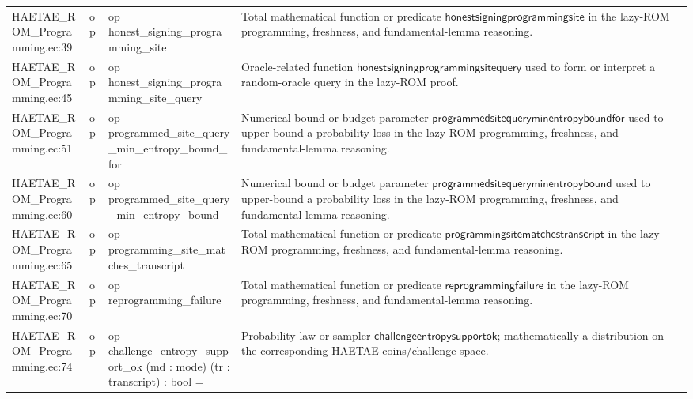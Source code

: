 \documentclass[10pt]{article}
\begin{document}
\begin{longtable}{L{0.11\textwidth}L{0.055\textwidth}L{0.385\textwidth}L{0.41\textwidth}}
HAETAE\_\allowbreak{}ROM\_\allowbreak{}Programming.\allowbreak{}ec:\allowbreak{}39 & op & {\ttfamily\scriptsize op honest\_\allowbreak{}signing\_\allowbreak{}programming\_\allowbreak{}site} & Total mathematical function or predicate $\mathsf{honestsigningprogrammingsite}$ in the lazy-ROM programming, freshness, and fundamental-lemma reasoning. \\
HAETAE\_\allowbreak{}ROM\_\allowbreak{}Programming.\allowbreak{}ec:\allowbreak{}45 & op & {\ttfamily\scriptsize op honest\_\allowbreak{}signing\_\allowbreak{}programming\_\allowbreak{}site\_\allowbreak{}query} & Oracle-related function $\mathsf{honestsigningprogrammingsitequery}$ used to form or interpret a random-oracle query in the lazy-ROM proof. \\
HAETAE\_\allowbreak{}ROM\_\allowbreak{}Programming.\allowbreak{}ec:\allowbreak{}51 & op & {\ttfamily\scriptsize op programmed\_\allowbreak{}site\_\allowbreak{}query\_\allowbreak{}min\_\allowbreak{}entropy\_\allowbreak{}bound\_\allowbreak{}for} & Numerical bound or budget parameter $\mathsf{programmedsitequeryminentropyboundfor}$ used to upper-bound a probability loss in the lazy-ROM programming, freshness, and fundamental-lemma reasoning. \\
HAETAE\_\allowbreak{}ROM\_\allowbreak{}Programming.\allowbreak{}ec:\allowbreak{}60 & op & {\ttfamily\scriptsize op programmed\_\allowbreak{}site\_\allowbreak{}query\_\allowbreak{}min\_\allowbreak{}entropy\_\allowbreak{}bound} & Numerical bound or budget parameter $\mathsf{programmedsitequeryminentropybound}$ used to upper-bound a probability loss in the lazy-ROM programming, freshness, and fundamental-lemma reasoning. \\
HAETAE\_\allowbreak{}ROM\_\allowbreak{}Programming.\allowbreak{}ec:\allowbreak{}65 & op & {\ttfamily\scriptsize op programming\_\allowbreak{}site\_\allowbreak{}matches\_\allowbreak{}transcript} & Total mathematical function or predicate $\mathsf{programmingsitematchestranscript}$ in the lazy-ROM programming, freshness, and fundamental-lemma reasoning. \\
HAETAE\_\allowbreak{}ROM\_\allowbreak{}Programming.\allowbreak{}ec:\allowbreak{}70 & op & {\ttfamily\scriptsize op reprogramming\_\allowbreak{}failure} & Total mathematical function or predicate $\mathsf{reprogrammingfailure}$ in the lazy-ROM programming, freshness, and fundamental-lemma reasoning. \\
HAETAE\_\allowbreak{}ROM\_\allowbreak{}Programming.\allowbreak{}ec:\allowbreak{}74 & op & {\ttfamily\scriptsize op challenge\_\allowbreak{}entropy\_\allowbreak{}support\_\allowbreak{}ok (md : mode) (tr : transcript) : bool =} & Probability law or sampler $\mathsf{challengeentropysupportok}$; mathematically a distribution on the corresponding HAETAE coins/challenge space. \\

\end{longtable}
\end{document}
